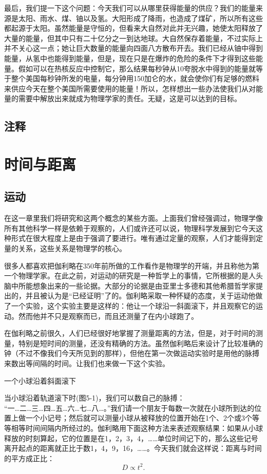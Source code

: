 \documentclass[12pt,oneside]{book}
\begin{document}
\begin{common-format}
最后，我们提一下这个问题：今天我们可以从哪里获得能量的供应？我们的能量来源是太阳、雨水、煤、铀以及氢。大阳形成了降雨，也造成了煤矿，所以所有这些都起源于太阳。虽然能量是守恒的，但看来大自然对此并无兴趣，她使太阳释放了大量的能量，但其中只有二十亿分之一到达地球。大自然保存着能量，不过实际上并不关心这一点；她让巨大数量的能量向四面八方散布开去。我们已经从铀中得到能量，从氢中也能得到能量，但是，现在只是在爆炸的危险的条件下才得到这些能量。假如可以在热核反应中控制它，那么结果每秒钟从10夸脱水中得到的能量就等于整个美国每秒钟所发的电量，每分钟用150加仑的水，就会使你们有足够的燃料来供应今天在整个美国所需要使用的能量！所以，怎样想出一些办法使我们从对能量的需要中解放出来就成为物理学家的责任。无疑，这是可以达到的目标。

\section{注释}
\showendnotes



\chapter{时间与距离}
\section{运动}
在这一章里我们将研究和这两个概念的某些方面。上面我们曾经强调过，物理学像所有其他科学一样是依赖于观察的，人们或许还可以说，物理科学发展到它今天这种形式在很大程度上是由于强调了要进行。唯有通过定量的观察，人们才能得到定量的关系，这些关系是物理学的核心。

很多人都喜欢把伽利略在350年前所做的工作看作是物理学的开端，并且称他为第一个物理学家。在此之前，对运动的研究是一种哲学上的事情，它所根据的是人头脑中所能想象出来的一些论据。大部分的论据是由亚里士多德和其他希腊哲学家提出的，并且被认为是“已经证明”了的。伽利略采取一种怀疑的态度，关于运动他做了一个实验，这个实验主要是这样的：他让一个球沿一斜面滚下，并且观察它的运动。然而他并不只是观察而已，而且还测量了在内小球跑了。

在伽利略之前很久，人们已经很好地掌握了测量距离的方法，但是，对于时间的测量，特别是短时间的测量，还没有精确的方法。虽然伽利略后来设计了比较准确的钟（不过不像我们今天所见到的那样），但他在第一次做运动实验时是用他的脉搏来数出等间隔的时间。让我们也来做一下这个实验。
\begin{fig}{一个小球沿着斜面滚下}
\caption{一个小球沿着斜面滚下}
\label{fig:一个小球沿着斜面滚下}
\end{fig}
当小球沿着轨道滚下时(图5-1)，我们可以数自己的脉搏：\\“一…二…三…四…五…六…七…八…。”我们请一个朋友于每数一次就在小球所到达的位置上做一个小记号；然后就可以测量小球从被释放的位置开始在1个、2个或3个等等相等时间间隔内所经过的。伽利略用下面这种方法来表述观察结果：如果从小球释放的时刻算起，它的位置是在1，2，3，4，……单位时间记下的，那么这些记号离开起点的距离就正比于数1，4，9，16，……。今天我们就会这样说：距离与时间的平方成正比：
\begin{equation*}
D\propto t^2.
\end{equation*}


\end{common-format}
\end{document}
